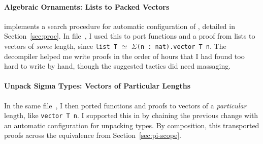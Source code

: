 \paragraph{Algebraic Ornaments: Lists to Packed Vectors}
\iffalse
The transformation in \toolnamec is a generalization of the transformation from \textsc{Devoid}.
\textsc{Devoid} supported proof reuse across \textit{algebraic ornaments}, which describe relations
between two inductive types, where one type is the other indexed by a fold~\cite{mcbride}.
A standard example is the relation between a list and a
length-indexed vector (Figure~\ref{fig:listtovect}).
\fi
\toolnamec implements a search procedure for automatic configuration of ,
detailed in Section~\ref{sec:proc}.
In file~\href{https://github.com/uwplse/pumpkin-pi/blob/v2.0.0/plugin/coq/examples/Example.v}{}, I used this to port
functions and a proof from lists to vectors of \textit{some} length, since \lstinline{list T} $\simeq$ $\Sigma$\lstinline{(n : nat).vector T n}.
The decompiler helped me write proofs in the order of hours that I had found too hard to write by hand,
though the suggested tactics did need massaging.

\paragraph{Unpack Sigma Types: Vectors of Particular Lengths}
In the same file~\href{https://github.com/uwplse/pumpkin-pi/blob/v2.0.0/plugin/coq/examples/Example.v}{}, I then ported functions and proofs to 
vectors of a \textit{particular} length, like \lstinline{vector T n}.
I supported this in \toolnamec by chaining the previous change
with an automatic configuration for unpacking \kl{$\Sigma$} types.
By composition, this transported proofs across the equivalence from Section~\ref{sec:pi-scope}.

